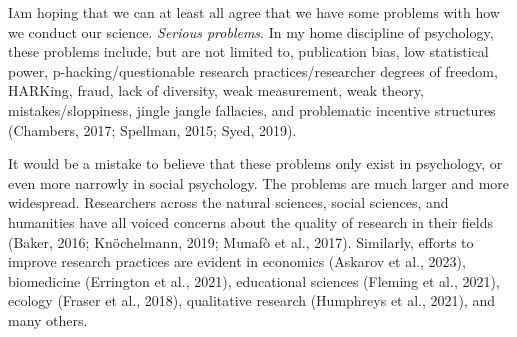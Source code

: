 \documentclass[authordate, empirical,issue]{jote-new-article}
\author[1]{\mbox{Moin Syed\orcid{0000-0003-4759-3555}}}
\affil[1]{Department of Psychology, University of Minnesota}
\begin{document}
\begin{frontmatter}
  \maketitle
  \begin{abstract}
    \printabstracttext
  \end{abstract}
\end{frontmatter}
































\lettrine{I} am hoping that we can at least all agree that we have some problems with how we conduct our science. \emph{Serious problems}. In my home discipline of psychology, these problems include, but are not limited to, publication bias, low statistical power, p-hacking/questionable research practices/researcher degrees of freedom, HARKing, fraud, lack of diversity, weak measurement, weak theory, mistakes/sloppiness, jingle jangle fallacies, and problematic incentive structures (Chambers, 2017; Spellman, 2015; Syed, 2019).







It would be a mistake to believe that these problems only exist in psychology, or even more narrowly in social psychology. The problems are much larger and more widespread. Researchers across the natural sciences, social sciences, and humanities have all voiced concerns about the quality of research in their fields (Baker, 2016; Knöchelmann, 2019; Munafò et al., 2017). Similarly, efforts to improve research practices are evident in economics (Askarov et al., 2023), biomedicine (Errington et al., 2021), educational sciences (Fleming et al., 2021), ecology (Fraser et al., 2018), qualitative research (Humphreys et al., 2021), and many others.
\end{document}
